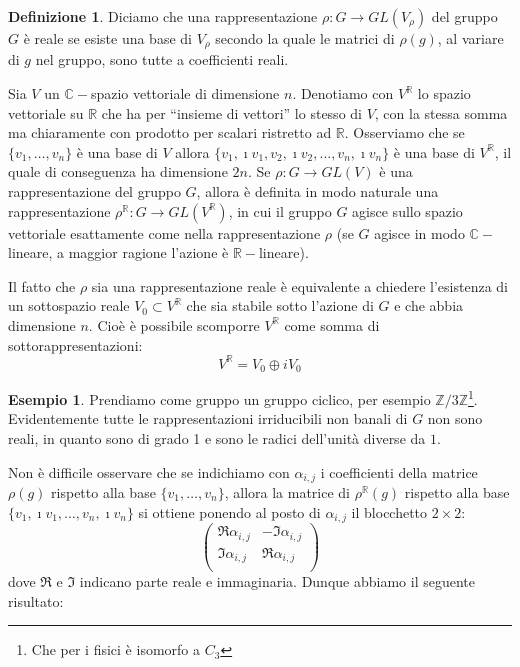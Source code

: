 \documentclass[11pt]{article}
\theoremstyle{plain}
\theoremstyle{definition}
\newtheorem{defn}{Definizione}[section]
\newtheorem{exmp}{Esempio}[section]
\theoremstyle{remark}
\newcommand{\C}{\mathbb{C}}
\newcommand{\R}{\mathbb{R}}
\newcommand{\Z}{\mathbb{Z}}
\begin{document}
\begin{defn}
Diciamo che una rappresentazione $\rho:G\to GL(V_\rho)$ del gruppo $G$ è reale se esiste una base di $V_\rho$ secondo la quale
le matrici di $\rho(g)$, al variare di $g$ nel gruppo, sono tutte a coefficienti reali.
\label{def: rappr reale}
\end{defn}

Sia $V$ un $\C-$spazio vettoriale di dimensione $n$.
Denotiamo con $V^\R$ lo spazio vettoriale su $\R$ che ha per ``insieme di vettori''
lo stesso di $V$, con la stessa somma ma chiaramente con prodotto per scalari ristretto ad $\R$.
Osserviamo che se $\{v_1, \dots, v_n\}$ è una base di $V$ allora
$\{v_1, \imath v_1, v_2, \imath v_2,\dots, v_n, \imath v_n\}$ è una base di $V^\R$, il quale di conseguenza ha dimensione $2n$.
Se $\rho:G\to GL(V)$ è una rappresentazione del gruppo $G$, allora è definita
in modo naturale una rappresentazione $\rho^\R:G\to GL(V^\R)$, in cui il gruppo $G$
agisce sullo spazio vettoriale esattamente come nella rappresentazione $\rho$ (se $G$ agisce
in modo $\C-$lineare, a maggior ragione l'azione è $\R-$lineare).

Il fatto che $\rho$ sia una rappresentazione reale è equivalente a chiedere l'esistenza di un sottospazio reale $V_0 \subset V^\R$ che sia stabile sotto l'azione di $G$ e che abbia dimensione $n$. Cioè è possibile scomporre $V^\R$ come somma di sottorappresentazioni:
\[ V^\R = V_0 \oplus i V_0 \]

\begin{exmp}
Prendiamo come gruppo un gruppo ciclico, per esempio $\Z / 3\Z$\footnote{Che per i fisici è isomorfo a $C_3$}. Evidentemente tutte le rappresentazioni irriducibili non banali di $G$ non sono reali, in quanto sono di grado 1 e sono le radici dell'unità diverse da $1$.
\end{exmp}

Non è difficile osservare che se indichiamo con $\alpha_{i,j}$ i coefficienti della matrice $\rho(g)$
rispetto alla base $\{v_1, \dots, v_n\}$, allora la matrice di $\rho^\R(g)$ rispetto alla base
$\{v_1, \imath v_1,\dots, v_n, \imath v_n\}$ si ottiene
ponendo al posto di $\alpha_{i,j}$ il blocchetto $2\times 2$:
\[\begin{pmatrix}
	\Re \alpha_{i,j} & -\Im \alpha_{i,j}\\
	\Im \alpha_{i,j} & \Re \alpha_{i,j}\\
\end{pmatrix}\]
dove $\Re$ e $\Im$ indicano parte reale e immaginaria.
Dunque abbiamo il seguente risultato:
\end{document}
